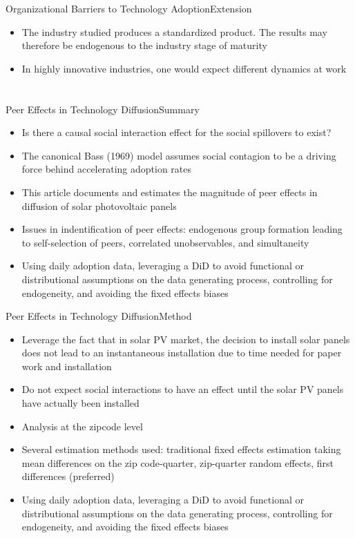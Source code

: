 \documentclass{beamer}
\begin{document}
\begin{frame}{Organizational Barriers to Technology Adoption}{Extension}
\begin{itemize}
\item{The industry studied produces a standardized product. The results may therefore be endogenous to the industry stage of maturity}
\item{In highly innovative industries, one would expect different dynamics at work}
\end{itemize}
\end{frame}


\section{\cite{Bollinger2012}}
\begin{frame}{Peer Effects in Technology Diffusion}{Summary}
\begin{itemize}
\item{Is there a causal social interaction effect for the social spillovers to exist?}
\item{The canonical Bass (1969) model assumes social contagion to be a driving force behind accelerating adoption rates}
\item{This article documents and estimates the magnitude of peer effects in diffusion of solar photovoltaic panels}
\item{Issues in indentification of peer effects: endogenous group formation leading to self-selection of peers, correlated unobservables, and simultaneity}
\item{Using daily adoption data, leveraging a DiD to avoid functional or distributional assumptions on the data generating process, controlling for endogeneity, and avoiding the fixed effects biases}
\end{itemize}
\end{frame}

\begin{frame}{Peer Effects in Technology Diffusion}{Method}
\begin{itemize}
\item{Leverage the fact that in solar PV market, the decision  to install solar panels does not lead to an instantaneous installation due to time needed for paper work and installation}
\item{Do not expect social interactions to have an effect until the solar PV panels have actually been installed}
\item{Analysis at the zipcode level}
\item{Several estimation methods used: traditional fixed effects estimation taking mean differences on the zip code-quarter, zip-quarter random effects, first differences  (preferred)}
\item{Using daily adoption data, leveraging a DiD to avoid functional or distributional assumptions on the data generating process, controlling for endogeneity, and avoiding the fixed effects biases}
\end{itemize}
\end{frame}
\end{document}
